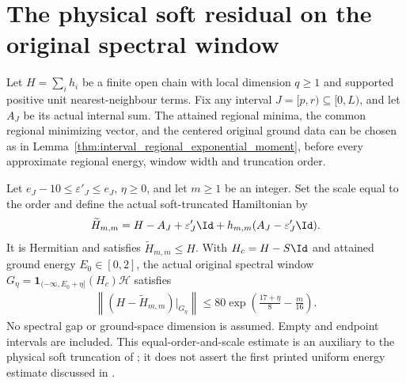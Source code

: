 \section{The physical soft residual on the original spectral window}

\begin{lemma}
    \label{thm:interval_physical_soft_truncation_residual}
    \leanok
    Let $H=\sum_i h_i$ be a finite open chain with local dimension $q\ge1$
    and supported positive unit nearest-neighbour terms. Fix any interval
    $J=[p,r)\subseteq[0,L)$, and let $A_J$ be its actual internal sum.
    The attained regional minima, the common regional minimizing vector,
    and the centered original ground data can be chosen as in
    Lemma~\ref{thm:interval_regional_exponential_moment}, before every
    approximate regional energy, window width and truncation order.

    Let $e_J-10\le\varepsilon'_J\le e_J$, $\eta\ge0$, and let $m\ge1$ be
    an integer. Set the scale equal to the order and define the actual
    soft-truncated Hamiltonian by
    \begin{align*}
        \widetilde H_{m,m}
        =H-A_J+\varepsilon'_J\Id
        +h_{m,m}(A_J-\varepsilon'_J\Id).
    \end{align*}
    It is Hermitian and satisfies $\widetilde H_{m,m}\le H$.
    With $H_c=H-S\Id$ and attained ground energy $E_0\in[0,2]$, the actual
    original spectral window
    $G_\eta=\mathbf1_{(-\infty,E_0+\eta]}(H_c)\mathcal H$ satisfies
    \begin{align}
        \left\|(H-\widetilde H_{m,m})|_{G_\eta}\right\|
        \le80\exp\left(\frac{17+\eta}{8}-\frac m{16}\right).
        \label{eq:physical_soft_original_residual}
    \end{align}
    No spectral gap or ground-space dimension is assumed. Empty and endpoint
    intervals are included. This equal-order-and-scale estimate is an
    auxiliary to the physical soft truncation of \cite{Arad2016RigorousRG};
    it does not assert the first printed uniform energy estimate discussed
    in \cite{gap:alvv16_soft_truncation_energy_estimate}.
\end{lemma}
